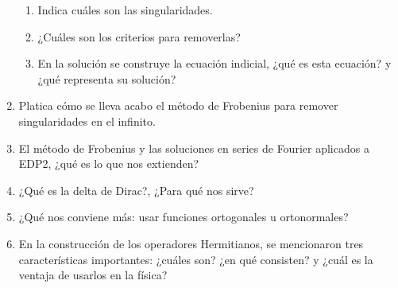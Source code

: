 \begin{enumerate}
\begin{enumerate}[label=\alph*)]
\item Indica cuáles son las singularidades.
\item ¿Cuáles son los criterios para removerlas?
\item En la solución se construye la ecuación indicial, ¿qué es esta ecuación? y ¿qué representa su solución?
\end{enumerate}
\item Platica cómo se lleva acabo el método de Frobenius para remover singularidades en el infinito.
\item El método de Frobenius y las soluciones en series de Fourier aplicados a EDP2, ¿qué es lo que nos extienden?
\item ¿Qué es la delta de Dirac?, ¿Para qué nos sirve?
\item ¿Qué nos conviene más: usar funciones ortogonales u ortonormales?
\item En la construcción de los operadores Hermitianos, se mencionaron tres características importantes: ¿cuáles son? ¿en qué consisten? y ¿cuál es la ventaja de usarlos en la física?
\end{enumerate}
